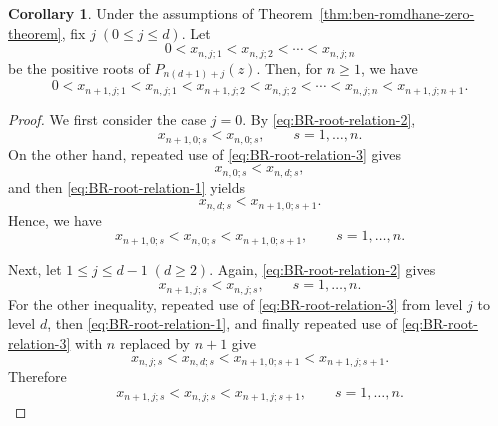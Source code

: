 \documentclass[preprint,3p,10pt]{elsarticle}
\theoremstyle{definition}
\newtheorem{corollary}[definition]{Corollary}
\begin{document}
\begin{corollary}\label{cor:fixed-level-interlacing}
Under the assumptions of Theorem~\ref{thm:ben-romdhane-zero-theorem}, fix
\(j\; (0\le j\le d)\). Let
\begin{equation}
    0<x_{n,j;1}<x_{n,j;2}<\cdots<x_{n,j;n}
\end{equation}
be the positive roots of \(P_{n(d+1)+j}(z)\). Then, for \(n\geq1\), we have
\begin{equation}
    0<
    x_{n+1,j;1}
    <
    x_{n,j;1}
    <
    x_{n+1,j;2}
    <
    x_{n,j;2}
    <
    \cdots
    <
    x_{n,j;n}
    <
    x_{n+1,j;n+1}.
\end{equation}
\end{corollary}

\begin{proof}
We first consider the case \(j=0\). By
\eqref{eq:BR-root-relation-2},
\begin{equation}
    x_{n+1,0;s}<x_{n,0;s},
    \qquad s=1,\ldots,n.
\end{equation}
On the other hand, repeated use of \eqref{eq:BR-root-relation-3} gives
\begin{equation}
    x_{n,0;s}<x_{n,d;s},
\end{equation}
and then \eqref{eq:BR-root-relation-1} yields
\begin{equation}
    x_{n,d;s}<x_{n+1,0;s+1}.
\end{equation}
Hence, we have
\begin{equation}
    x_{n+1,0;s}<x_{n,0;s}<x_{n+1,0;s+1},
    \qquad s=1,\ldots,n.
\end{equation}

Next, let \(1\leq j\leq d-1 \; (d\ge2)\).  Again,
\eqref{eq:BR-root-relation-2} gives
\begin{equation}
    x_{n+1,j;s}<x_{n,j;s},
    \qquad s=1,\ldots,n.
\end{equation}
For the other inequality, repeated use of \eqref{eq:BR-root-relation-3} from
level \(j\) to level \(d\), then \eqref{eq:BR-root-relation-1}, and finally
repeated use of \eqref{eq:BR-root-relation-3} with \(n\) replaced by \(n+1\)
give
\begin{equation}
    x_{n,j;s}
    <
    x_{n,d;s}
    <
    x_{n+1,0;s+1}
    <
    x_{n+1,j;s+1}.
\end{equation}
Therefore
\begin{equation}
    x_{n+1,j;s}<x_{n,j;s}<x_{n+1,j;s+1},
    \qquad s=1,\ldots,n.
\end{equation}


\end{proof}
\end{document}
